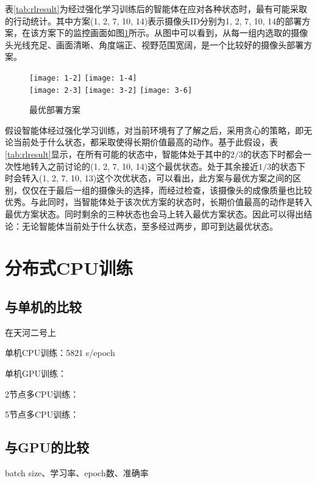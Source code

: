 表\ref{tab:rlresult}为经过强化学习训练后的智能体在应对各种状态时，最有可能采取的行动统计。其中方案(1, 2, 7, 10, 14)表示摄像头ID分别为1, 2, 7, 10, 14的部署方案，在该方案下的监控画面如图\ref{fig:rlresult}所示。从图中可以看到，从每一组内选取的摄像头光线充足、画面清晰、角度端正、视野范围宽阔，是一个比较好的摄像头部署方案。

\begin{figure}
\centering
\texttt{[image: 1-2]}
\texttt{[image: 1-4]}\\
\texttt{[image: 2-3]}
\texttt{[image: 3-2]}
\texttt{[image: 3-6]}
\caption{最优部署方案}
\label{fig:rlresult}
\end{figure}

假设智能体经过强化学习训练，对当前环境有了了解之后，采用贪心的策略，即无论当前处于什么状态，都采取使得长期价值最高的动作。基于此假设，表\ref{tab:rlresult}显示，在所有可能的状态中，智能体处于其中的$2/3$的状态下时都会一次性地转入之前讨论的(1, 2, 7, 10, 14)这个最优状态。处于其余接近$1/3$的状态下时会转入(1, 2, 7, 10, 13)这个次优状态，可以看出，此方案与最优方案之间的区别，仅仅在于最后一组的摄像头的选择，而经过检查，该摄像头的成像质量也比较优秀。与此同时，当智能体处于该次优方案的状态时，长期价值最高的动作是转入最优方案状态。同时剩余的三种状态也会马上转入最优方案状态。因此可以得出结论：无论智能体当前处于什么状态，至多经过两步，即可到达最优状态。

\section{分布式CPU训练}

\subsection{与单机的比较}

在天河二号上

单机CPU训练：5821 s/epoch

单机GPU训练：

2节点多CPU训练：

5节点多CPU训练：

\subsection{与GPU的比较}

batch size、学习率、epoch数、准确率